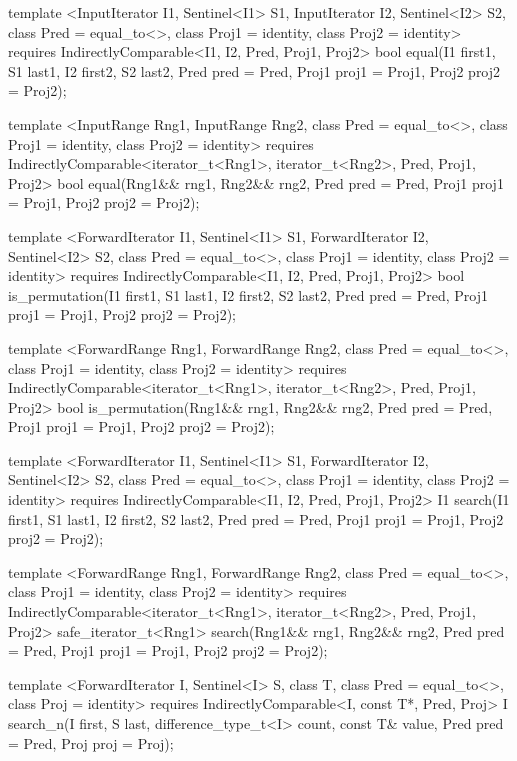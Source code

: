 {\begin{codeblock}
{{    template <InputIterator I1, Sentinel<I1> S1, InputIterator I2, Sentinel<I2> S2,
        class Pred = equal_to<>, class Proj1 = identity, class Proj2 = identity>
      requires IndirectlyComparable<I1, I2, Pred, Proj1, Proj2>
      bool equal(I1 first1, S1 last1, I2 first2, S2 last2,
                Pred pred = Pred{},
                Proj1 proj1 = Proj1{}, Proj2 proj2 = Proj2{});

    template <InputRange Rng1, InputRange Rng2, class Pred = equal_to<>,
        class Proj1 = identity, class Proj2 = identity>
      requires IndirectlyComparable<iterator_t<Rng1>, iterator_t<Rng2>, Pred, Proj1, Proj2>
      bool equal(Rng1&& rng1, Rng2&& rng2, Pred pred = Pred{},
                Proj1 proj1 = Proj1{}, Proj2 proj2 = Proj2{});

    template <ForwardIterator I1, Sentinel<I1> S1, ForwardIterator I2,
        Sentinel<I2> S2, class Pred = equal_to<>, class Proj1 = identity,
        class Proj2 = identity>
      requires IndirectlyComparable<I1, I2, Pred, Proj1, Proj2>
      bool is_permutation(I1 first1, S1 last1, I2 first2, S2 last2,
                          Pred pred = Pred{},
                          Proj1 proj1 = Proj1{}, Proj2 proj2 = Proj2{});

    template <ForwardRange Rng1, ForwardRange Rng2, class Pred = equal_to<>,
        class Proj1 = identity, class Proj2 = identity>
      requires IndirectlyComparable<iterator_t<Rng1>, iterator_t<Rng2>, Pred, Proj1, Proj2>
      bool is_permutation(Rng1&& rng1, Rng2&& rng2, Pred pred = Pred{},
                          Proj1 proj1 = Proj1{}, Proj2 proj2 = Proj2{});

    template <ForwardIterator I1, Sentinel<I1> S1, ForwardIterator I2,
        Sentinel<I2> S2, class Pred = equal_to<>,
        class Proj1 = identity, class Proj2 = identity>
      requires IndirectlyComparable<I1, I2, Pred, Proj1, Proj2>
      I1 search(I1 first1, S1 last1, I2 first2, S2 last2,
                Pred pred = Pred{},
                Proj1 proj1 = Proj1{}, Proj2 proj2 = Proj2{});

    template <ForwardRange Rng1, ForwardRange Rng2, class Pred = equal_to<>,
        class Proj1 = identity, class Proj2 = identity>
      requires IndirectlyComparable<iterator_t<Rng1>, iterator_t<Rng2>, Pred, Proj1, Proj2>
      safe_iterator_t<Rng1>
        search(Rng1&& rng1, Rng2&& rng2, Pred pred = Pred{},
              Proj1 proj1 = Proj1{}, Proj2 proj2 = Proj2{});

    template <ForwardIterator I, Sentinel<I> S, class T,
        class Pred = equal_to<>, class Proj = identity>
      requires IndirectlyComparable<I, const T*, Pred, Proj>
      I search_n(I first, S last, difference_type_t<I> count,
                const T& value, Pred pred = Pred{},
                Proj proj = Proj{});

}}
\end{codeblock}}
